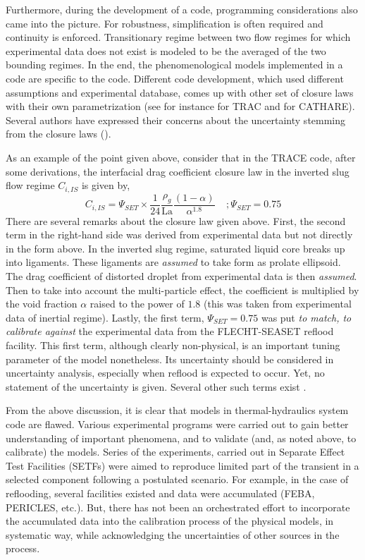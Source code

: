 \documentclass[11pt,titlepage]{article}
\begin{document}
Furthermore, during the development of a code, programming considerations also came into the picture. 
For robustness, simplification is often required and continuity is enforced. 
Transitionary regime between two flow regimes for which experimental data does not exist is modeled to be the averaged of the two bounding regimes. 
In the end, the phenomenological models implemented in a code are specific to the code. 
Different code development, which used different assumptions and experimental database, comes up with other set of closure laws with their own parametrization (see for instance \cite{Nelson1992} for TRAC and \cite{Bestion1990} for CATHARE). 
Several authors have expressed their concerns about the uncertainty stemming from the closure laws (\cite{Wulff2007, DAuria2012, Petruzzi2008}).

As an example of the point given above, consider that in the TRACE code, after some derivations, the interfacial drag coefficient closure law in the inverted slug flow regime $C_{i,IS}$ is given by,
\begin{equation}
C_{i,IS} = \Psi_{SET} \times \frac{1}{24}\frac{\rho_g}{\text{La}}\frac{(1-\alpha)}{\alpha^{1.8}} \; \; \; \; ;\Psi_{SET} = 0.75
\end{equation}
There are several remarks about the closure law given above. 
First, the second term in the right-hand side was derived from experimental data but not directly in the form above. 
In the inverted slug regime, saturated liquid core breaks up into ligaments. 
These ligaments are \emph{assumed} to take form as prolate ellipsoid. 
The drag coefficient of distorted droplet from experimental data is then \emph{assumed}. 
Then to take into account the multi-particle effect, the coefficient is multiplied by the void fraction $\alpha$ raised to the power of $1.8$ (this was taken from experimental data of inertial regime). 
Lastly, the first term, $\Psi_{SET} = 0.75$ was put \emph{to match, to calibrate against} the experimental data from the FLECHT-SEASET reflood facility. 
This first term, although clearly non-physical, is an important tuning parameter of the model nonetheless. 
Its uncertainty should be considered in uncertainty analysis, especially when reflood is expected to occur.
Yet, no statement of the uncertainty is given. 
Several other such terms exist \cite{TraceTheory2012}.

From the above discussion, it is clear that models in thermal-hydraulics system code are flawed. 
Various experimental programs were carried out to gain better understanding of important phenomena, and to validate (and, as noted above, to calibrate) the models. 
Series of the experiments, carried out in Separate Effect Test Facilities (SETFs) were aimed to reproduce limited part of the transient in a selected component following a postulated scenario. 
For example, in the case of reflooding, several facilities existed and data were accumulated (FEBA, PERICLES, etc.). 
But, there has not been an orchestrated effort to incorporate the accumulated data into the calibration process of the physical models, in systematic way, while acknowledging the uncertainties of other sources in the process. 
\end{document}
